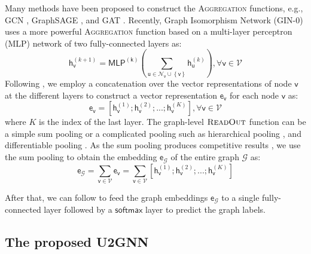 \documentclass[twoside,leqno,twocolumn]{article}
\newcommand{\citep}{\cite}
\begin{document}
Many methods have been proposed to construct the \textsc{Aggregation} functions, e.g., GCN \citep{kipf2017semi}, GraphSAGE \citep{hamilton2017inductive}, and GAT \citep{velickovic2018graph}. Recently, Graph Isomorphism Network (GIN-0) \citep{xu2019powerful} uses a more powerful \textsc{Aggregation} function based on a multi-layer perceptron (MLP) network of two fully-connected layers as:
\begin{equation}
\boldsymbol{\mathsf{h}}_{\mathsf{v}}^{(k+1)} = \mathsf{MLP^{(k)}}\left(\sum_{\mathsf{u} \in \mathcal{N}_\mathsf{v}\cup\left\{\mathsf{v}\right\}}\boldsymbol{\mathsf{h}}_{\mathsf{u}}^{(k)}\right) , \forall \mathsf{v} \in \mathcal{V}
\label{equa:gin}
\end{equation}
Following \citep{xu2019powerful}, we employ a concatenation over the vector representations of node $\mathsf{v}$ at the different layers to construct a vector representation $\boldsymbol{\mathsf{e}}_\mathsf{v}$ for each node $\mathsf{v}$ as:
\begin{equation}
\boldsymbol{\mathsf{e}}_\mathsf{v} = \left[\boldsymbol{\mathsf{h}}_\mathsf{v}^{(1)}; \boldsymbol{\mathsf{h}}_\mathsf{v}^{(2)}; ...; \boldsymbol{\mathsf{h}}_\mathsf{v}^{(K)}\right] , \forall \mathsf{v} \in \mathcal{V}
\label{equa:noderepresentation}
\end{equation}
where $K$ is the index of the last layer.
The graph-level $\textsc{ReadOut}$ function can be a simple sum pooling \citep{xu2019powerful} or a complicated pooling such as hierarchical pooling \citep{cangea2018towards}, and differentiable pooling \citep{Ying2018diffpool}. 
As the sum pooling produces competitive results \citep{xu2019powerful}, we use the sum pooling to obtain the embedding $\boldsymbol{\mathsf{e}}_{\mathcal{G}}$ of the entire graph $\mathcal{G}$ as:
\begin{equation}
\boldsymbol{\mathsf{e}}_{\mathcal{G}} = \sum_{\mathsf{v} \in \mathcal{V}}\boldsymbol{\mathsf{e}}_\mathsf{v} =\sum_{\mathsf{v} \in \mathcal{V}}\left[\boldsymbol{\mathsf{h}}_\mathsf{v}^{(1)}; \boldsymbol{\mathsf{h}}_\mathsf{v}^{(2)}; ...; \boldsymbol{\mathsf{h}}_\mathsf{v}^{(K)}\right]
\label{equa:graphemb}
\end{equation}

After that, we can follow \citep{xu2019powerful} to feed the graph embeddings $\boldsymbol{\mathsf{e}}_{\mathcal{G}}$ to a single fully-connected layer followed by a $\mathsf{softmax}$ layer to predict the graph labels.



\subsection{The proposed U2GNN} 
\end{document}
